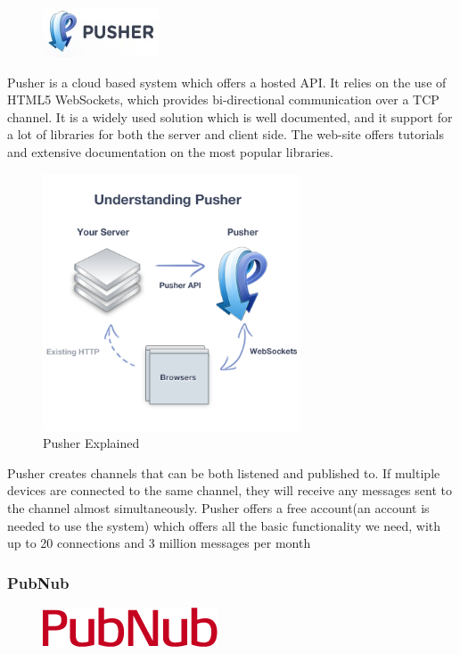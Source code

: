 \begin{figure}
\centering
\includegraphics[width=.19\textwidth]{image/pusher-logo.jpg}
\end{figure}

Pusher is a cloud based system which offers a hosted API. It relies on the use of HTML5 WebSockets, which provides bi-directional communication over a TCP channel. It is a widely used solution which is well documented, and it support for a lot of libraries for both the server and client side. The web-site offers tutorials and extensive documentation on the most popular libraries. 

\begin{figure}
\centering
\includegraphics[width=3in]{image/pusher-explained.png}
\caption{Pusher Explained}
\end{figure}


Pusher creates channels that can be both listened and published to. If multiple devices are connected to the same channel, they will receive any messages sent to the channel almost simultaneously. Pusher offers a free account(an account is needed to use the system) which offers all the basic functionality we need, with up to 20 connections and 3 million messages per month

\subsubsection{PubNub}

\begin{figure}
\centering
\includegraphics[width=.19\textwidth]{image/pubnub-logo.png}
\end{figure}

